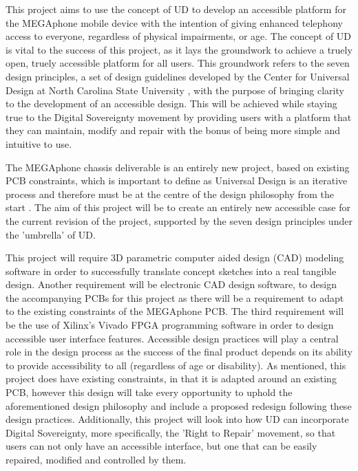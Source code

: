 This project aims to use the concept of UD to develop an accessible platform for the MEGAphone mobile device with the intention of giving enhanced telephony access to everyone, regardless of physical impairments, or age.
The concept of UD is vital to the success of this project, as it lays the groundwork to achieve a truely open, truely accessible platform for all users. 
This groundwork refers to the seven design principles, a set of design guidelines developed by the Center for Universal Design at North Carolina State University \cite{sevenprinciples}, with the purpose of bringing clarity to the development of an accessible design.
This will be achieved while staying true to the Digital Sovereignty movement by providing users with a platform that they can maintain, modify and repair with the bonus of being more simple and intuitive to use.

The MEGAphone chassis deliverable is an entirely new project, based on existing PCB constraints, which is important to define as Universal Design is an iterative process and therefore must be at the centre of the design philosophy from the start \cite{incldesign}.
The aim of this project will be to create an entirely new accessible case for the current revision of the project, supported by the seven design principles under the 'umbrella' of UD.

This project will require 3D parametric computer aided design (CAD) modeling software in order to successfully translate concept sketches into a real tangible design.
Another requirement will be electronic CAD design software, to design the accompanying PCBs for this project as there will be a requirement to adapt to the existing constraints of the MEGAphone PCB.
The third requirement will be the use of Xilinx's Vivado FPGA programming software in order to design accessible user interface features.
Accessible design practices will play a central role in the design process as the success of the final product depends on its ability to provide accessibility to all (regardless of age or disability). 
As mentioned, this project does have existing constraints, in that it is adapted around an existing PCB, however this design will take every opportunity to uphold the aforementioned design philosophy and include a proposed redesign following these design practices.
Additionally, this project will look into how UD can incorporate Digital Sovereignty, more specifically, the 'Right to Repair' movement, so that users can not only have an accessible interface, but one that can be easily repaired, modified and controlled by them.

